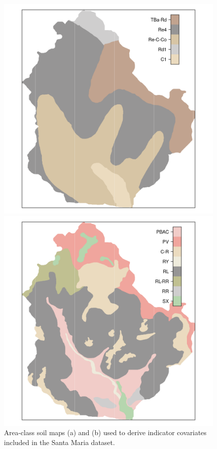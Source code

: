 \begin{figure}[!ht]
\centering
\begin{minipage}[b]{0.45\textwidth}
\subcaption{}
\centering
\includegraphics[width = \textwidth]{fig/chap05-soil-old}
\end{minipage}
\begin{minipage}[b]{0.45\textwidth}
\subcaption{}
\centering
\includegraphics[width = \textwidth]{fig/chap05-soil-new}
\end{minipage} 
\caption[Area-class soil maps included in the Santa Maria dataset.]{Area-class soil maps (a) \soilOld{} and (b) 
\soilNew{} used to derive indicator covariates included in the Santa Maria dataset.}
\label{fig:chap05-soil-maps}
\end{figure}

